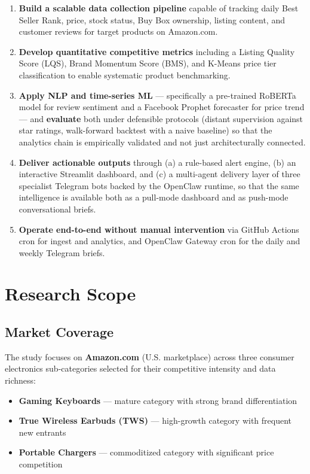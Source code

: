 \begin{enumerate}
  \item \textbf{Build a scalable data collection pipeline} capable of tracking daily
  Best Seller Rank, price, stock status, Buy Box ownership, listing content, and customer
  reviews for target products on Amazon.com.

  \item \textbf{Develop quantitative competitive metrics} including a Listing Quality
  Score (LQS), Brand Momentum Score (BMS), and K-Means price tier classification to
  enable systematic product benchmarking.

  \item \textbf{Apply NLP and time-series ML} --- specifically a pre-trained
  RoBERTa model for review sentiment and a Facebook Prophet forecaster for
  price trend --- and \textbf{evaluate} both under defensible protocols
  (distant supervision against star ratings, walk-forward backtest with a
  naive baseline) so that the analytics chain is empirically validated and
  not just architecturally connected.

  \item \textbf{Deliver actionable outputs} through (a) a rule-based alert
  engine, (b) an interactive Streamlit dashboard, and (c) a multi-agent
  delivery layer of three specialist Telegram bots backed by the OpenClaw
  runtime, so that the same intelligence is available both as a
  pull-mode dashboard and as push-mode conversational briefs.

  \item \textbf{Operate end-to-end without manual intervention} via GitHub
  Actions cron for ingest and analytics, and OpenClaw Gateway cron for the
  daily and weekly Telegram briefs.
\end{enumerate}

\section{Research Scope}

\subsection{Market Coverage}
The study focuses on \textbf{Amazon.com} (U.S. marketplace) across three consumer
electronics sub-categories selected for their competitive intensity and data richness:
\begin{itemize}
  \item \textbf{Gaming Keyboards} — mature category with strong brand differentiation
  \item \textbf{True Wireless Earbuds (TWS)} — high-growth category with frequent new entrants
  \item \textbf{Portable Chargers} — commoditized category with significant price competition
\end{itemize}

